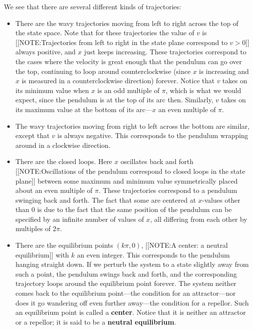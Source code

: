 \enlargethispage*{30pt}
We see that there are several different kinds of trajectories:
\begin{itemize}

\item There are the wavy trajectories moving from left to right across
  the top of the state space.  Note that for these trajectories the
  value of $v$ is [[NOTE:Trajectories from left to right in the state
    plane correspond to $v>0$]] always positive, and $x$ just keeps
  increasing.  These trajectories correspond to the cases where the
  velocity is great enough that the pendulum can go over the top,
  continuing to loop around counterclockwise (since $x$ is increasing
  and $x$ is measured in a counterclockwise direction) forever.
  Notice that $v$ takes on its minimum value when $x$ is an odd
  multiple of $\pi$, which is what we would expect, since the pendulum
  is at the top of its arc then.  Similarly, $v$ takes on its maximum
  value at the bottom of its arc---$x$ an even multiple of $\pi$.

\item The wavy trajectories moving from right to left across the
  bottom are similar, except that $v$ is always negative.  This
  corresponds to the pendulum wrapping around in a clockwise
  direction.

\item There are the closed loops.  Here $x$ oscillates back and forth
  [[NOTE:Oscillations of the pendulum correspond to closed loops in the
    state plane]] between some maximum and minimum value symmetrically
  placed about an even multiple of $\pi$. These trajectories
  correspond to a pendulum swinging back and forth.  The fact that
  some are centered at $x$-values other than 0 is due to the fact that
  the same position of the pendulum can be specified by an infinite
  number of values of $x$, all differing from each other by multiples
  of $2\pi$.

\item There are the equilibrium points $(k\pi, 0)$,
[[NOTE:A center: a neutral equilibrium]]
with $k$ an even integer.  This corresponds to the pendulum hanging
straight down.  If we perturb the system to a state slightly away from
such a point, the pendulum swings back and forth, and the
corresponding trajectory loops around the equilibrium point forever.
The system neither comes back to the equilibrium point---the condition
for an attractor---nor does it go wandering off even further
away---the condition for a repellor.  Such an equilibrium point is
called a {\bf center}. Notice that it is neither an
attractor or a repellor; it is said to be a {\bf neutral
  equilibrium}.


\end{itemize}
